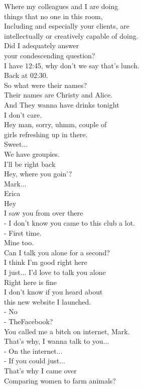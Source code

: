 \documentclass{article}
\begin{document}
\begin{multicols}{3}
Where my colleagues and I are doing\\
things that no one in this room,\\
Including and especially your clients, are\\
intellectually or creatively capable of doing.\\
Did I adequately answer\\
your condescending question?\\
I have 12:45, why don't we say that's lunch.\\
Back at 02:30.\\
So what were their names?\\
Their names are Christy and Alice.\\
And They wanna have drinks tonight\\
I don't care.\\
Hey man, sorry, uhmm, couple of\\
girls refreshing up in there.\\
Sweet...\\
We have groupies.\\
I'll be right back\\
Hey, where you goin'?\\
Mark...\\
Erica\\
Hey\\
I saw you from over there\\
- I don't know you came to this club a lot.\\
- First time.\\
Mine too.\\
Can I talk you alone for a second?\\
I think I'm good right here\\
I just... I'd love to talk you alone\\
Right here is fine\\
I don't know if you heard about\\
this new website I launched.\\
- No\\
- TheFacebook?\\
You called me a bitch on internet, Mark.\\
That's why, I wanna talk to you...\\
- On the internet...\\
- If you could just...\\
That's why I came over\\
Comparing women to farm animals?\\

\end{multicols}
\end{document}
